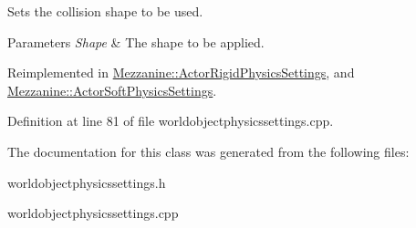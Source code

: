 Sets the collision shape to be used. 


\begin{DoxyParams}{Parameters}
{\em Shape} & The shape to be applied. \\
\hline
\end{DoxyParams}


Reimplemented in \hyperlink{classMezzanine_1_1ActorRigidPhysicsSettings_a7583e5afc93dedc8a4403ea156fa0413}{Mezzanine::ActorRigidPhysicsSettings}, and \hyperlink{classMezzanine_1_1ActorSoftPhysicsSettings_a4cbaf52fbdedf9c4e0328d3dd608207e}{Mezzanine::ActorSoftPhysicsSettings}.



Definition at line 81 of file worldobjectphysicssettings.cpp.



The documentation for this class was generated from the following files:\begin{DoxyCompactItemize}
\item 
worldobjectphysicssettings.h\item 
worldobjectphysicssettings.cpp\end{DoxyCompactItemize}
